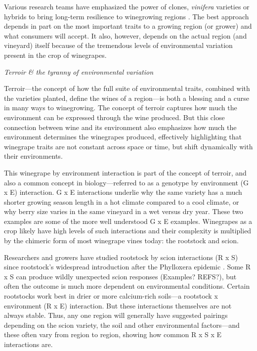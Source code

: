 \documentclass[11pt]{article}
\begin{document}
Various research teams have emphasized the power of clones, \emph{vinifera} varieties or hybrids to bring long-term resilience to winegrowing regions \citep[e.g.,][]{Myles2013,duchene2016,Wolkovich2017}. The best approach depends in part on the most important traits to a growing region (or grower) and what consumers will accept. It also, however, depends on the actual region (and vineyard) itself because of the tremendous levels of environmental variation present in the crop of winegrapes. 

\emph{Terroir \& the tyranny of environmental variation}

Terroir---the concept of how the full suite of environmental traits, combined with the varieties planted, define the wines of a region---is both a blessing and a curse in many ways to winegrowing. The concept of terroir captures how much the environment can be expressed through the wine produced. But this close connection between wine and its environment also emphasizes how much the environment determines the winegrapes produced, effectively highlighting that winegrape traits are not constant across space or time, but shift dynamically with their environments. 

This winegrape by environment interaction is part of the concept of terroir, and also a common concept in biology---referred to as a genotype by environment (G x E) interaction. G x E interactions underlie why the same variety has a much shorter growing season length in a hot climate compared to a cool climate, or why berry size varies in the same vineyard in a wet versus dry year. These two examples are some of the more well understood G x E examples. Winegrapes as a crop likely have high levels of such interactions and their complexity is multiplied by the chimeric form of most winegrape vines today: the rootstock and scion. 

Researchers and growers have studied rootstock by scion interactions (R x S) since rootstock's widespread introduction after the Phylloxera epidemic \citep[e.g.,][]{pouget1982,lupe1988,gautier2020,marguerit2012,tandonnet2010}. Some R x S can produce wildly unexpected scion responses (Examples? REFS?), but often the outcome is much more dependent on environmental conditions. Certain rootstocks work best in drier or more calcium-rich soils---a rootstock x environment (R x E) interaction. But these interactions themselves are not always stable. Thus, any one region will generally have suggested pairings depending on the scion variety, the soil and other environmental factors---and these often vary from region to region, showing how common R x S x E interactions are. 
\end{document}
